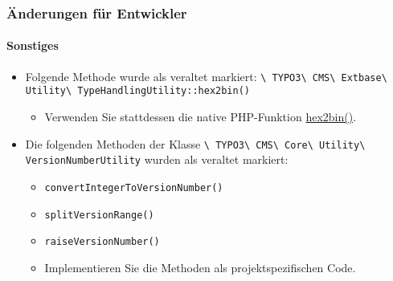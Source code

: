 \begin{frame}[fragile]
	\frametitle{Änderungen für Entwickler}
	\framesubtitle{Sonstiges}

	\begin{itemize}

		\item Folgende Methode wurde als veraltet markiert:\newline
			\smaller\texttt{\textbackslash
				TYPO3\textbackslash
				CMS\textbackslash
				Extbase\textbackslash
				Utility\textbackslash
				TypeHandlingUtility::hex2bin()}\normalsize

			\begin{itemize}\smaller
				\item[\ding{228}] Verwenden Sie stattdessen die native PHP-Funktion \href{https://www.php.net/manual/en/function.hex2bin.php}{hex2bin()}.
			\end{itemize}\normalsize

		\item Die folgenden Methoden der Klasse
			\smaller\texttt{\textbackslash
				TYPO3\textbackslash
				CMS\textbackslash
				Core\textbackslash
				Utility\textbackslash
				VersionNumberUtility}\normalsize\newline
			wurden als veraltet markiert:

			\begin{itemize}
				\item \texttt{convertIntegerToVersionNumber()}
				\item \texttt{splitVersionRange()}
				\item \texttt{raiseVersionNumber()}
			\end{itemize}

			\begin{itemize}\smaller
				\item[\ding{228}] Implementieren Sie die Methoden als projektspezifischen Code.
			\end{itemize}\normalsize

	\end{itemize}

\end{frame}



